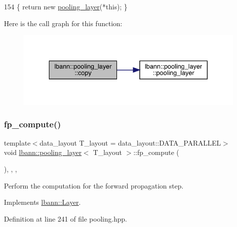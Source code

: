 \begin{DoxyCode}
154 \{ \textcolor{keywordflow}{return} \textcolor{keyword}{new} \hyperlink{classlbann_1_1pooling__layer_a012223832bcd60644724425488059152}{pooling\_layer}(*\textcolor{keyword}{this}); \}
\end{DoxyCode}
Here is the call graph for this function\+:\nopagebreak
\begin{figure}[H]
\begin{center}
\leavevmode
\includegraphics[width=327pt]{classlbann_1_1pooling__layer_a58f9e6223649bb79ad10a2411602d71d_cgraph}
\end{center}
\end{figure}
\mbox{\label{classlbann_1_1pooling__layer_a0af01b6939abe9798fa3a0b1f5292721}} 
\subsubsection{\texorpdfstring{fp\+\_\+compute()}{fp\_compute()}}
{\footnotesize\ttfamily template$<$data\+\_\+layout T\+\_\+layout = data\+\_\+layout\+::\+D\+A\+T\+A\+\_\+\+P\+A\+R\+A\+L\+L\+EL$>$ \\
void \hyperlink{classlbann_1_1pooling__layer}{lbann\+::pooling\+\_\+layer}$<$ T\+\_\+layout $>$\+::fp\+\_\+compute (\begin{DoxyParamCaption}{ }\end{DoxyParamCaption})\hspace{0.3cm}{\ttfamily [inline]}, {\ttfamily [override]}, {\ttfamily [protected]}, {\ttfamily [virtual]}}

Perform the computation for the forward propagation step. 

Implements \hyperlink{classlbann_1_1Layer_a523319dd1bd87a0612afa1912bb5aad7}{lbann\+::\+Layer}.



Definition at line 241 of file pooling.\+hpp.


